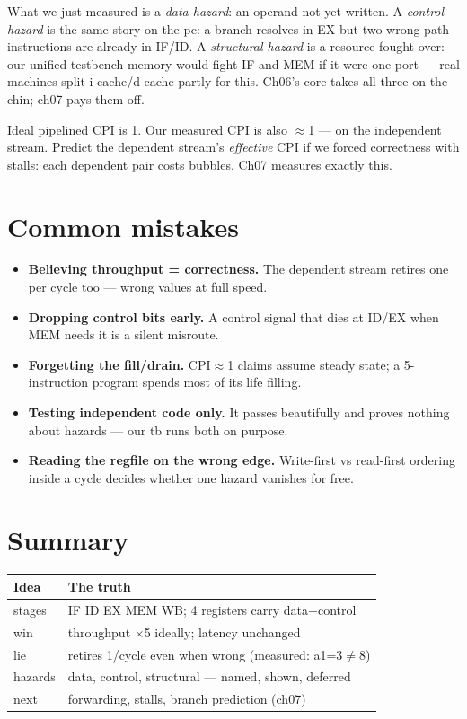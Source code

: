\begin{example}\label{ex:haznames06}
What we just measured is a \emph{data hazard}: an operand not yet
written. A \emph{control hazard} is the same story on the pc:
a branch resolves in EX but two wrong-path instructions are already
in IF/ID. A \emph{structural hazard} is a resource fought over:
our unified testbench memory would fight IF and MEM if it were
one port --- real machines split i-cache/d-cache partly for this.
Ch06's core takes all three on the chin; ch07 pays them off.
\end{example}

\begin{checkpoint}\label{cp:cpi06}
Ideal pipelined CPI is 1. Our measured CPI is also $\approx$1 ---
on the independent stream. Predict the dependent stream's
\emph{effective} CPI if we forced correctness with stalls: each
dependent pair costs bubbles. Ch07 measures exactly this.
\end{checkpoint}

\section{Common mistakes}
\label{sec:mistakes06}
\begin{itemize}
\item \textbf{Believing throughput = correctness.} The dependent
      stream retires one per cycle too --- wrong values at full
      speed.
\item \textbf{Dropping control bits early.} A control signal that
      dies at ID/EX when MEM needs it is a silent misroute.
\item \textbf{Forgetting the fill/drain.} CPI$\approx$1 claims
      assume steady state; a 5-instruction program spends most of
      its life filling.
\item \textbf{Testing independent code only.} It passes beautifully
      and proves nothing about hazards --- our tb runs both on
      purpose.
\item \textbf{Reading the regfile on the wrong edge.} Write-first
      vs read-first ordering inside a cycle decides whether one
      hazard vanishes for free.
\end{itemize}

\section{Summary}
\label{sec:summary06}
\begin{tabularx}{\linewidth}{@{}l X@{}}
\toprule
\textbf{Idea} & \textbf{The truth} \\
\midrule
stages & IF ID EX MEM WB; 4 registers carry data+control \\
win & throughput $\times$5 ideally; latency unchanged \\
lie & retires 1/cycle even when wrong (measured: a1=3$\neq$8) \\
hazards & data, control, structural --- named, shown, deferred \\
next & forwarding, stalls, branch prediction (ch07) \\
\bottomrule
\end{tabularx}


